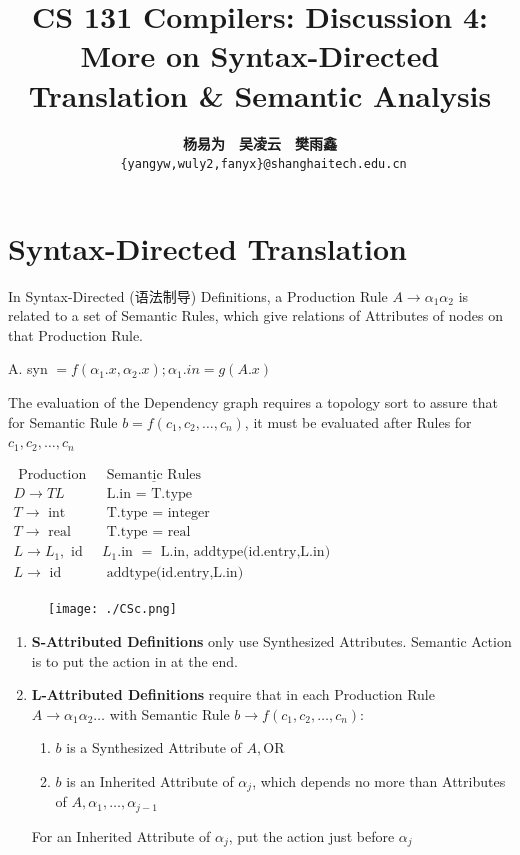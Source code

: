 \documentclass[a4paper]{exam}
\title{CS 131 Compilers: Discussion 4: More on Syntax-Directed Translation \& Semantic Analysis}
\author{\textbf{杨易为}~~\textbf{吴凌云}~~\textbf{樊雨鑫} \\ \texttt{ \{yangyw,wuly2,fanyx\}@shanghaitech.edu.cn}}
\begin{document}
\maketitle
\section{Syntax-Directed Translation}
In Syntax-Directed (语法制导) Definitions, a Production Rule $A \rightarrow \alpha_{1} \alpha_{2}$ is related to a set of Semantic Rules, which give relations of Attributes of nodes on that Production Rule.

A. syn $=f\left(\alpha_{1} . x, \alpha_{2} . x\right) ; \alpha_{1} . i n=g(A . x)$

The evaluation of the Dependency graph requires a topology sort to assure that for Semantic Rule $b=f\left(c_{1}, c_{2}, \ldots, c_{n}\right)$, it must be evaluated after Rules for $c_{1}, c_{2}, \ldots, c_{n}$

$\begin{array}{ll}\text { Production } & \underline{\text { Semantic Rules }} \\ {D} \rightarrow T L & \text { L.in = T.type } \\ T \rightarrow \text { int } & \text { T.type = integer } \\ T \rightarrow \text { real } & \text { T.type = real } \\L \rightarrow L_{1}, \text { id } & L_{1}. \text {in }=\text { L.in, addtype(id.entry,L.in) } \\ L \rightarrow \text { id } & \text { addtype(id.entry,L.in) }\end{array}$

\begin{figure}[htbp]
  \centering
  \texttt{[image: ./CSc.png]}
\end{figure}
\begin{enumerate}
  \item \textbf{S-Attributed Definitions} only use Synthesized Attributes. Semantic Action is to put the action in at the end.
  \item \textbf{L-Attributed Definitions} require that in each Production Rule $A \rightarrow \alpha_{1} \alpha_{2} \ldots$ with Semantic Rule $b \rightarrow f\left(c_{1}, c_{2}, \ldots, c_{n}\right):$
        \begin{enumerate}
          \item $b$ is a Synthesized Attribute of $A, \mathrm{OR}$
          \item $b$ is an Inherited Attribute of $\alpha_{j}$, which depends no more than Attributes of $A, \alpha_{1}, \ldots, \alpha_{j-1}$
        \end{enumerate}
        For an Inherited Attribute of $\alpha_{j}$, put the action just before $\alpha_{j}$
\end{enumerate}
\end{document}
